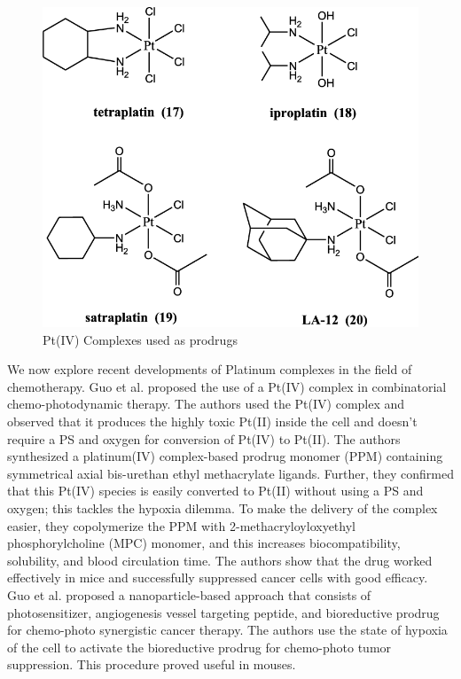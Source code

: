 \begin{figure}[!ht]
    \centering
    \includegraphics[scale = 0.35]{prodrugs.png}
    \caption{Pt(IV) Complexes used as prodrugs}
    \label{fig:prodrugs}
\end{figure}
\hspace{0.1cm}We now explore recent developments of Platinum complexes in the field of chemotherapy. Guo et al.  \cite{guo2018platinum} proposed the use of a Pt(IV) complex in combinatorial chemo-photodynamic therapy. The authors used the Pt(IV) complex and observed that it produces the highly toxic Pt(II) inside the cell and doesn't require a PS and oxygen for conversion of Pt(IV) to Pt(II). The authors synthesized a platinum(IV) complex-based prodrug monomer (PPM) containing symmetrical axial bis-urethan ethyl methacrylate ligands. Further, they confirmed that this Pt(IV) species is easily converted to Pt(II) without using a PS and oxygen; this tackles the hypoxia dilemma. To make the delivery of the complex easier, they copolymerize the PPM with 2-methacryloyloxyethyl phosphorylcholine (MPC) monomer, and this increases biocompatibility, solubility, and blood circulation time. The authors show that the drug worked effectively in mice and successfully suppressed cancer cells with good efficacy. Guo et al. \cite{guo2017prodrug} proposed a nanoparticle-based approach that consists of photosensitizer, angiogenesis vessel targeting peptide, and bioreductive prodrug for chemo-photo synergistic cancer therapy. The authors use the state of hypoxia of the cell to activate the bioreductive prodrug for chemo-photo tumor suppression. This procedure proved useful in mouses. 

